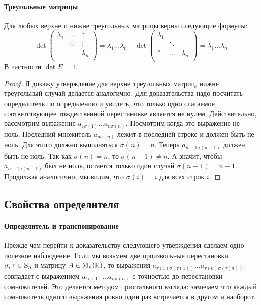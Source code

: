 \paragraph{Треугольные матрицы}

\begin{claim}\label{claim::DetUpperTr}
Для любых верхне и нижне треугольных матрицы верны следующие формулы:
\[
\det
\begin{pmatrix}
{\lambda_1}&{\ldots}&{*}\\
{}&{\ddots}&{\vdots}\\
{}&{}&{\lambda_n}\\
\end{pmatrix}
 = 
\lambda_1 \ldots \lambda_n
\quad
\det
\begin{pmatrix}
{\lambda_1}&{}&{}\\
{\vdots}&{\ddots}&{}\\
{*}&{\ldots}&{\lambda_n}\\
\end{pmatrix}
 = 
 \lambda_1 \ldots \lambda_n
\]
В частности $\det E = 1$.
\end{claim}
\begin{proof}
Я докажу утверждение для верхне треугольных матриц, нижне треугольный случай делается аналогично. Для доказательства надо посчитать определитель по определению и увидеть, что только одно слагаемое соответствующее тождественной перестановке является не нулем. Действительно, рассмотрим выражение $a_{1\sigma(1)}\ldots a_{n\sigma(n)}$. Посмотрим когда это выражение не ноль. Последний множитель $a_{n\sigma(n)}$ лежит в последней строке и должен быть не ноль. Для этого должно выполняться $\sigma(n) = n$. Теперь $a_{n-1\sigma(n-1)}$ должен быть не ноль. Так как $\sigma(n) = n$, то $\sigma(n - 1)\neq n$. А значит, чтобы $a_{n-1 \sigma(n-1)}$ был не ноль, остается только один случай $\sigma(n-1) = n-1$. Продолжая аналогично, мы видим, что $\sigma(i) = i$ для всех строк $i$.
\end{proof}

\subsection{Свойства определителя}

\paragraph{Определитель и транспонирование}

Прежде чем перейти к доказательству следующего утверждения сделаем одно полезное наблюдение. Если мы возьмем две произвольные перестановки $\sigma,\tau\in\operatorname{S}_{n}$ и матрицу $A\in\operatorname{M}_{n}(\mathbb R)$, то выражения $a_{\tau(1) \sigma(\tau (1))}\ldots a_{\tau(n) \sigma(\tau(n))}$ совпадает с выражением $a_{1\sigma(1)}\ldots a_{n\sigma(n)}$ с точностью до перестановки сомножителей. Это делается методом пристального взгляда: замечаем что каждый сомножитель одного выражения ровно один раз встречается в другом и наоборот.

